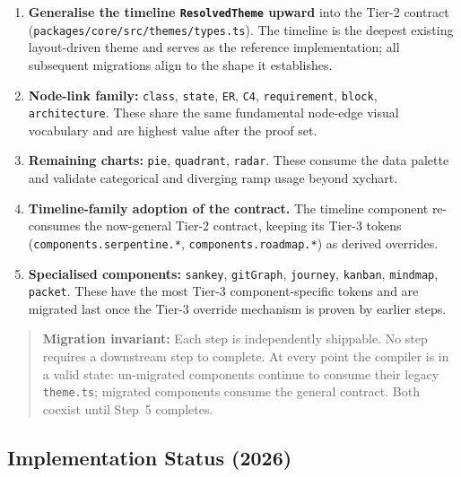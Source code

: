 \begin{enumerate}
  \item \textbf{Generalise the timeline \texttt{ResolvedTheme} upward} into the Tier-2
        contract (\texttt{packages/core/src/themes/types.ts}). The timeline is the deepest
        existing layout-driven theme and serves as the reference implementation; all
        subsequent migrations align to the shape it establishes.

  \item \textbf{Node-link family:} \texttt{class}, \texttt{state}, \texttt{ER}, \texttt{C4},
        \texttt{requirement}, \texttt{block}, \texttt{architecture}. These share the same
        fundamental node-edge visual vocabulary and are highest value after the proof set.

  \item \textbf{Remaining charts:} \texttt{pie}, \texttt{quadrant}, \texttt{radar}.
        These consume the data palette and validate categorical and diverging ramp usage
        beyond xychart.

  \item \textbf{Timeline-family adoption of the contract.} The timeline component
        re-consumes the now-general Tier-2 contract, keeping its Tier-3 tokens
        (\texttt{components.serpentine.*}, \texttt{components.roadmap.*}) as derived
        overrides.

  \item \textbf{Specialised components:} \texttt{sankey}, \texttt{gitGraph},
        \texttt{journey}, \texttt{kanban}, \texttt{mindmap}, \texttt{packet}.
        These have the most Tier-3 component-specific tokens and are migrated last
        once the Tier-3 override mechanism is proven by earlier steps.
\end{enumerate}

\begin{quote}
\textbf{Migration invariant:} Each step is independently shippable. No step requires a
downstream step to complete. At every point the compiler is in a valid state: un-migrated
components continue to consume their legacy \texttt{theme.ts}; migrated components consume
the general contract. Both coexist until Step~5 completes.
\end{quote}

\subsection{Implementation Status (2026)}
\label{sec:contract-impl-status}


